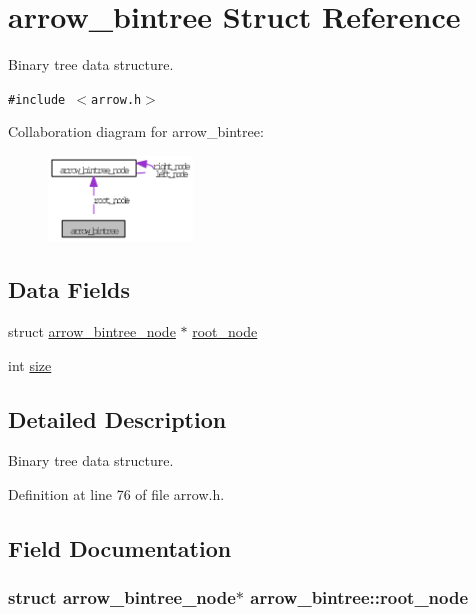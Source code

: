 \hypertarget{structarrow__bintree}{
\section{arrow\_\-bintree Struct Reference}
\label{structarrow__bintree}
}
Binary tree data structure.  


{\tt \#include $<$arrow.h$>$}

Collaboration diagram for arrow\_\-bintree:\nopagebreak
\begin{figure}[H]
\begin{center}
\leavevmode
\includegraphics[width=109pt]{structarrow__bintree__coll__graph}
\end{center}
\end{figure}
\subsection*{Data Fields}
\begin{CompactItemize}
\item 
struct \hyperlink{structarrow__bintree__node}{arrow\_\-bintree\_\-node} $\ast$ \hyperlink{structarrow__bintree_09f6d0bd6e32ae2c2f8df57a31388df6}{root\_\-node}
\item 
int \hyperlink{structarrow__bintree_7570628df0b5317cc8e240499ba12974}{size}
\end{CompactItemize}


\subsection{Detailed Description}
Binary tree data structure. 

Definition at line 76 of file arrow.h.

\subsection{Field Documentation}
\hypertarget{structarrow__bintree_09f6d0bd6e32ae2c2f8df57a31388df6}{
\subsubsection{\setlength{\rightskip}{0pt plus 5cm}struct {\bf arrow\_\-bintree\_\-node}$\ast$ {\bf arrow\_\-bintree::root\_\-node}}}
\label{structarrow__bintree_09f6d0bd6e32ae2c2f8df57a31388df6}



